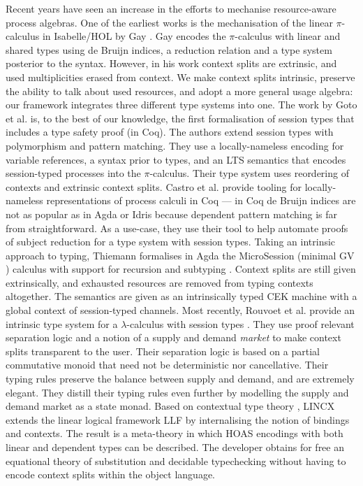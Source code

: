 \documentclass[sigplan,10pt,anonymous,review]{acmart}
\theoremstyle{definition}
\newcommand{\lambdacalc}{$\lambda$-calculus}
\newcommand{\picalc}{$\pi$-calculus}
\begin{document}
Recent years have seen an increase in the efforts to mechanise resource-aware process algebras.
One of the earliest works is the mechanisation of the linear \picalc{} in Isabelle/HOL by Gay \cite{Gay2001}.
Gay encodes the \picalc{} with linear and shared types using de Bruijn indices, a reduction relation and a type system posterior to the syntax.
However, in his work context splits are extrinsic, and used multiplicities erased from context.
We make context splits intrinsic, preserve the ability to talk about used resources, and adopt a more general usage algebra: our framework integrates three different type systems into one.
%
The work by Goto et al. \cite{Goto2016a} is, to the best of our knowledge, the first formalisation of session types that includes a type safety proof (in Coq). 
The authors extend session types with polymorphism and pattern matching.
They use a locally-nameless encoding for variable references, a syntax prior to types, and an LTS semantics that encodes session-typed processes into the \picalc{}.
Their type system uses reordering of contexts and extrinsic context splits. 
%
Castro et al. \cite{Castro2020} provide tooling for locally-nameless representations of process calculi in Coq  --- in Coq de Bruijn indices are not as popular as in Agda or Idris because dependent pattern matching is far from straightforward.
As a use-case, they use their tool to help automate proofs of subject reduction for a type system with session types.
%
Taking an intrinsic approach to typing, Thiemann formalises in Agda the MicroSession (minimal GV \cite{Gay2010}) calculus with support for recursion and subtyping \cite{Thiemann2019}.
Context splits are still given extrinsically, and exhausted resources are removed from typing contexts altogether.
The semantics are given as an intrinsically typed CEK machine with a global context of session-typed channels.
%
Most recently, Rouvoet et al. provide an intrinsic type system for a \lambdacalc{} with session types \cite{Rouvoet2020}.
They use proof relevant separation logic and a notion of a supply and demand \emph{market} to make context splits transparent to the user.
Their separation logic is based on a partial commutative monoid that need not be deterministic nor cancellative.
Their typing rules preserve the balance between supply and demand, and are extremely elegant.
They distill their typing rules even further by modelling the supply and demand market as a state monad.
%
Based on contextual type theory \cite{Pientkaa, Pientka}, LINCX \cite{Georges2017} extends the linear logical framework LLF \cite{Cervesato1996} by internalising the notion of bindings and contexts.
The result is a meta-theory in which HOAS encodings with both linear and dependent types can be described.
The developer obtains for free an equational theory of substitution and decidable typechecking without having to encode context splits within the object language.
\end{document}
